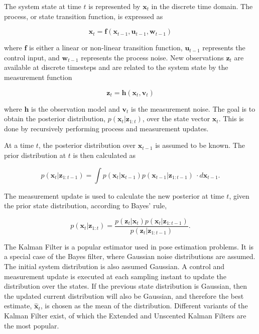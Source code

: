 \noindent
The system state at time $t$ is represented by $\mathbf{x}_t$ in the discrete time domain. The process, or state transition function, is expressed as

\begin{equation}
    \mathbf{x}_t = \mathbf{f}(\mathbf{x}_{t-1},\mathbf{u}_{t-1},\mathbf{w}_{t-1})
\end{equation}

\noindent
where $\mathbf{f}$ is either a linear or non-linear transition function, $\mathbf{u}_{t-1}$ represents the control input, and $\mathbf{w}_{t-1}$ represents the process 
noise. New observations $\mathbf{z}_t$ are available at discrete timesteps and are related to the system state by the measurement function

\begin{equation}
    \mathbf{z}_t = \mathbf{h}(\mathbf{x}_t,\mathbf{v}_t)
\end{equation}

\noindent
where $\mathbf{h}$ is the observation model and $\mathbf{v}_t$ is the measurement noise. The goal is to obtain the
posterior distribution, $p(\mathbf{x}_t|\mathbf{z}_{1:t})$, over the state vector $\mathbf{x}_t$. This is done by recursively performing process and measurement updates.
\vspace{0.5cm}

\noindent
At a time $t$, the posterior distribution over $\mathbf{x}_{t-1}$ is assumed to be known. The prior distribution at $t$ is then calculated as

\begin{equation}
    p(\mathbf{x}_t|\mathbf{z}_{1:t-1}) = \int p(\mathbf{x}_t|\mathbf{x}_{t-1})p(\mathbf{x}_{t-1}|\mathbf{z}_{1:t-1})\ \cdot d\mathbf{x}_{t-1} \text{.}
\end{equation}

\noindent
The measurement update is used to calculate the new posterior at time $t$, given the prior state distribution, according to Bayes' rule,

\begin{equation}
    p(\mathbf{x}_t|\mathbf{z}_{1:t}) = 
    \frac{p(\mathbf{z}_t|\mathbf{x}_t)p(\mathbf{x}_t|\mathbf{z}_{1:t-1})}{p(\mathbf{z}_t|\mathbf{z}_{1:t-1})} \text{.}
\end{equation}

\noindent
The Kalman Filter is a popular estimator used in pose estimation problems. It is a special case of the Bayes filter, where Gaussian noise distributions are assumed.
The initial system distribution is also assumed Gaussian. A control and measurement update is executed
at each sampling instant to update the distribution over the states. If the previous state distribution is Gaussian, then the updated current distribution will also be Gaussian,
and therefore the best estimate, $\hat{\mathbf{x}}_t$, is chosen as the mean of the distribution. Different variants of the Kalman Filter exist, of which the 
Extended and Unscented Kalman Filters are the most popular.
\vspace{0.5cm} 


